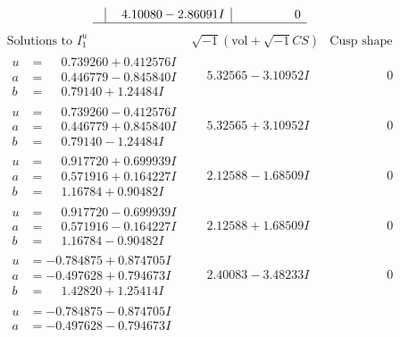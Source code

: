 \documentclass[1p]{elsarticle_modified}
\theoremstyle{definition}
\newcommand{\I}{\sqrt{-1}}
\begin{document}
$$\begin{array}{c|c|c}
 & \phantom{-}4.10080 - 2.86091 I & \phantom{-0.000000 } 0\\
 \hline 
 \end{array}$$\newpage$$\begin{array}{c|c|c}  
\text{Solutions to }I^u_{1}& \I (\text{vol} + \sqrt{-1}CS) & \text{Cusp shape}\\
 \hline 
\begin{aligned}
u &= \phantom{-}0.739260 + 0.412576 I \\
a &= \phantom{-}0.446779 - 0.845840 I \\
b &= \phantom{-}0.79140 + 1.24484 I\end{aligned}
 & \phantom{-}5.32565 - 3.10952 I & \phantom{-0.000000 } 0 \\ \hline\begin{aligned}
u &= \phantom{-}0.739260 - 0.412576 I \\
a &= \phantom{-}0.446779 + 0.845840 I \\
b &= \phantom{-}0.79140 - 1.24484 I\end{aligned}
 & \phantom{-}5.32565 + 3.10952 I & \phantom{-0.000000 } 0 \\ \hline\begin{aligned}
u &= \phantom{-}0.917720 + 0.699939 I \\
a &= \phantom{-}0.571916 + 0.164227 I \\
b &= \phantom{-}1.16784 + 0.90482 I\end{aligned}
 & \phantom{-}2.12588 - 1.68509 I & \phantom{-0.000000 } 0 \\ \hline\begin{aligned}
u &= \phantom{-}0.917720 - 0.699939 I \\
a &= \phantom{-}0.571916 - 0.164227 I \\
b &= \phantom{-}1.16784 - 0.90482 I\end{aligned}
 & \phantom{-}2.12588 + 1.68509 I & \phantom{-0.000000 } 0 \\ \hline\begin{aligned}
u &= -0.784875 + 0.874705 I \\
a &= -0.497628 + 0.794673 I \\
b &= \phantom{-}1.42820 + 1.25414 I\end{aligned}
 & \phantom{-}2.40083 - 3.48233 I & \phantom{-0.000000 } 0 \\ \hline\begin{aligned}
u &= -0.784875 - 0.874705 I \\
a &= -0.497628 - 0.794673 I \\

\end{aligned}
\end{array}$$
\end{document}
